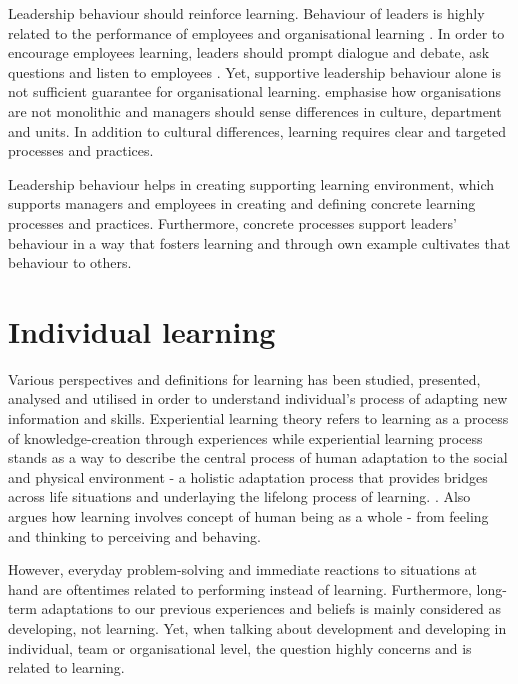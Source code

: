 Leadership behaviour should reinforce learning. Behaviour of leaders is highly related to the performance of employees \citep{kim2014blue} and organisational learning \citep{garvin2008yours}. In order to encourage employees learning, leaders should prompt dialogue and debate, ask questions and listen to employees \citep{kim2014blue,garvin2008yours}. Yet, supportive leadership behaviour alone is not sufficient guarantee for organisational learning. \citet{garvin2008yours}emphasise how organisations are not monolithic and managers should sense differences in culture, department and units. In addition to cultural differences, learning requires clear and targeted processes and practices. 

Leadership behaviour helps in creating supporting learning environment, which supports managers and employees in creating and defining concrete learning processes and practices. Furthermore, concrete processes support leaders' behaviour in a way that fosters learning and through own example cultivates that behaviour to others. \citep{garvin2008yours}

\section{Individual learning}
Various perspectives and definitions for learning has been studied, presented, analysed and utilised in order to understand individual's process of adapting new information and skills. Experiential learning theory refers to learning as a process of knowledge-creation through experiences while experiential learning process stands as a way to describe the central process of human adaptation to the social and physical environment - a holistic adaptation process that provides bridges across life situations and underlaying the lifelong process of learning. \citep{kolb1984experiential}. Also \citet{jung1923psychological} argues how learning involves concept of human being as a whole - from feeling and thinking to perceiving and behaving.

However, everyday problem-solving and immediate reactions to situations at hand are oftentimes related to performing instead of learning. Furthermore, long-term adaptations to our previous experiences and beliefs is mainly considered as developing, not learning. Yet, when talking about development and developing in individual, team or organisational level, the question highly concerns and is related to learning. \citep{kolb1984experiential}

